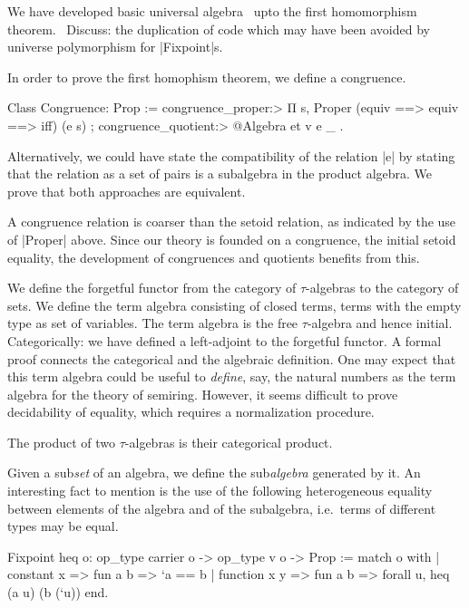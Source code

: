 \documentclass[a4paper,10pt, runningheads]{llncs}
\begin{document}
We have developed basic universal algebra~\cite{meinke1993universal} upto the first homomorphism
theorem.~
Discuss: the duplication of code which may have been avoided by universe
polymorphism for |Fixpoint|s.

In order to prove the first homophism theorem, we define a congruence.
\begin{code}
Class Congruence: Prop :=
    { congruence_proper:> Π s, Proper (equiv ==> equiv ==> iff) (e s)
    ; congruence_quotient:> @Algebra et v e _
    }.
\end{code}
Alternatively, we could have state the compatibility of the relation |e| by stating that the
relation as a set of pairs is a subalgebra in the product algebra. We prove that both approaches
are equivalent.

A congruence relation is coarser than the setoid relation, as indicated by the use of |Proper|
above. Since our theory is founded on a congruence, the initial setoid equality, the development of 
congruences and quotients benefits from this.

We define the forgetful functor from the category of $\tau$-algebras to the category of sets.
We define the term algebra consisting of closed terms, terms with the empty type as set of
variables. The term algebra is the free $\tau$-algebra and hence
initial. Categorically: we have defined a left-adjoint to the forgetful functor. A formal proof
connects the categorical and the algebraic definition.
One may expect that this term algebra could be useful to
\emph{define}, say, the natural numbers as the term algebra for the theory of semiring. However, it
seems difficult to prove decidability of equality, which requires a normalization procedure.

The product of two $\tau$-algebras is their categorical product.

Given a sub\emph{set} of an algebra, we define the sub\emph{algebra} generated by it.
An interesting fact to mention is the use of the following heterogeneous equality between
elements of the algebra and of the subalgebra, i.e.\ terms of different types may be equal.
\begin{code}
  Fixpoint heq {o}: op_type carrier o -> op_type v o -> Prop :=
    match o with
    | constant x => fun a b => `a == b
    | function x y => fun a b => forall u, heq (a u) (b (`u))
    end.
\end{code}
\end{document}

